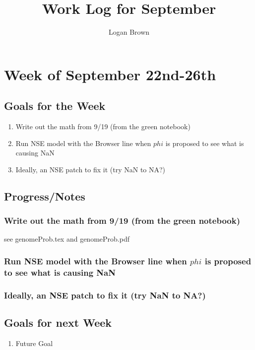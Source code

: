 

\title{Work Log for September}
\author{Logan Brown}


\maketitle


\setcounter{section}{3} %
\setcounter{subsection}{-1}
\setcounter{subsubsection}{0}

\section{Week of September 22nd-26th}
\subsection{Goals for the Week}
\begin{enumerate}
\item Write out the math from 9/19 (from the green notebook)
\item Run NSE model with the Browser line when $phi$ is proposed to see what is causing NaN
\item Ideally, an NSE patch to fix it (try NaN to NA?)
\end{enumerate}

\subsection{Progress/Notes}

\subsubsection{Write out the math from 9/19 (from the green notebook)}

see genomeProb.tex and genomeProb.pdf

\subsubsection{Run NSE model with the Browser line when $phi$ is proposed to see what is causing NaN}

\subsubsection{Ideally, an NSE patch to fix it (try NaN to NA?)}




\subsection{Goals for next Week}
\begin{enumerate}
\item Future Goal
\end{enumerate}


